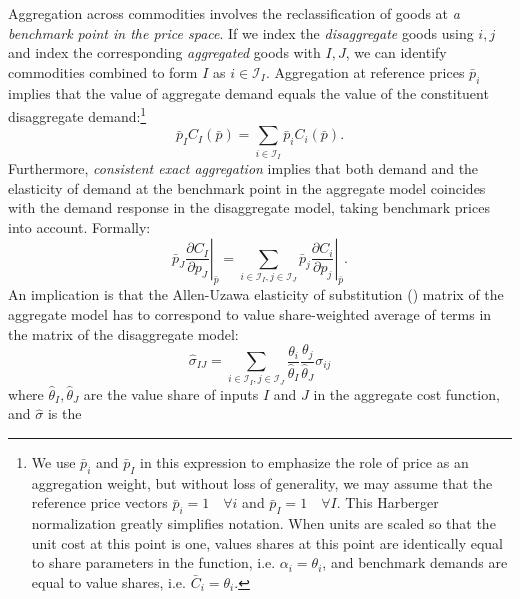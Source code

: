 Aggregation across commodities involves the reclassification of goods
at \textit{a benchmark point in the price space}. If we index the
\textit{disaggregate} goods using $i,j$ and index the corresponding
\textit{aggregated} goods with $I,J$, we can identify commodities
combined to form $I$ as $i \in \mathcal{I}_I$. Aggregation at
reference prices $\bar p_i$ implies that the value of aggregate demand
equals the value of the constituent disaggregate
demand:\footnote{\label{harberger}We use $\bar p_i$ and $\bar p_I$ in
this expression to emphasize the role of price as an aggregation
weight, but without loss of generality, we may assume that the
reference price vectors $\bar p_i = 1 \quad \forall i$ and $\bar p_I =
1 \quad \forall I$. This Harberger normalization greatly simplifies
notation. When units are scaled so that the unit cost at this point
is one, values shares at this point are identically equal to share
parameters in the \CES function, i.e. $\alpha_i = \theta_i$, and
benchmark demands are equal to value shares, i.e. $\bar C_i =
\theta_i.$}
\begin{equation}
\label{aggregation} \bar p_I C_I(\bar p) = \sum_{i \in \mathcal{I}_I}
\bar p_i C_i(\bar p). \end{equation} Furthermore, \textit{consistent
exact aggregation} implies that both demand and the elasticity of
demand at the benchmark point in the aggregate model coincides with
the demand response in the disaggregate model, taking benchmark prices
into account. Formally:
\begin{equation}
\label{ownpriceconsistency}
\bar p_J \left. \frac{\partial C_I}{\partial p_J} \right|_{\bar p} = \sum_{i \in \mathcal{I}_I, j \in
\mathcal{I}_J} \bar p_j \left. \frac{\partial C_i}{\partial p_j}
\right|_{\bar p}.
\end{equation}
An implication is that the Allen-Uzawa elasticity of substitution
(\AUES) matrix of the aggregate model has to correspond to
value share-weighted average of terms in the \AUES matrix of the
disaggregate model:
\begin{equation}
\label{exactform}
\hat \sigma_{IJ} = \sum_{i\in \mathcal{I}_I, j \in \mathcal{I}_J}
\frac{\theta_i}{\hat \theta_I} \frac{\theta_j}{\hat \theta_J}
\sigma_{ij}
\end{equation}
where $\hat \theta_I, \hat \theta_J$ are the value share of inputs $I$
and $J$ in the aggregate cost function, and $\hat \sigma$ is the \AUES
